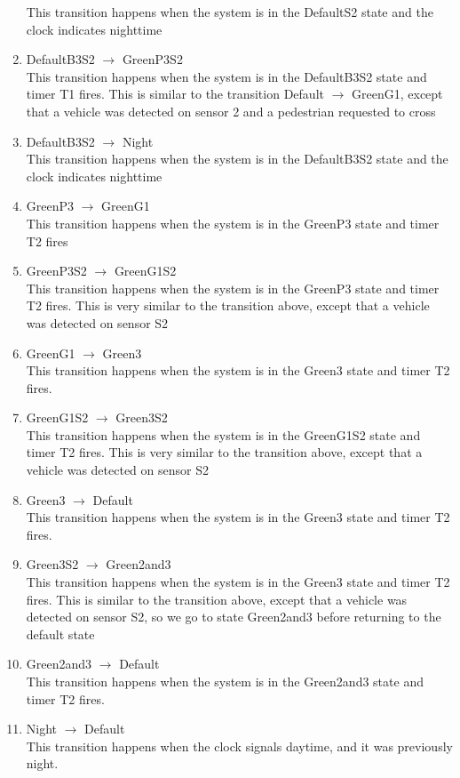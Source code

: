 \documentclass[letterpaper,12pt]{article}
\begin{document}
\begin{enumerate}
       This transition happens when the system is in the DefaultS2 state and the clock indicates nighttime
 \item DefaultB3S2 $\rightarrow$ GreenP3S2\\
       This transition happens when the system is in the DefaultB3S2 state and timer T1 fires.
       This is similar to the transition Default $\rightarrow$ GreenG1, except that a vehicle
       was detected on sensor 2 and a pedestrian requested to cross
 \item DefaultB3S2 $\rightarrow$ Night\\
       This transition happens when the system is in the DefaultB3S2 state and the clock indicates nighttime
 \item GreenP3 $\rightarrow$ GreenG1\\
       This transition happens when the system is in the GreenP3 state and timer T2 fires
 \item GreenP3S2 $\rightarrow$ GreenG1S2\\
       This transition happens when the system is in the GreenP3 state and timer T2 fires.
       This is very similar to the transition above, except that a vehicle was detected
       on sensor S2
 \item GreenG1 $\rightarrow$ Green3\\
       This transition happens when the system is in the Green3 state and timer T2 fires.
 \item GreenG1S2 $\rightarrow$ Green3S2\\
       This transition happens when the system is in the GreenG1S2 state and timer T2 fires.
       This is very similar to the transition above, except that a vehicle was detected
       on sensor S2
 \item Green3 $\rightarrow$ Default\\
       This transition happens when the system is in the Green3 state and timer T2 fires.
 \item Green3S2 $\rightarrow$ Green2and3\\
       This transition happens when the system is in the Green3 state and timer T2 fires.
       This is similar to the transition above, except that a vehicle was detected
       on sensor S2, so we go to state Green2and3 before returning to the default state
 \item Green2and3 $\rightarrow$ Default\\
       This transition happens when the system is in the Green2and3 state and timer T2 fires.
 \item Night $\rightarrow$ Default\\
       This transition happens when the clock signals daytime, and it was previously night.
\end{enumerate}
\end{document}
